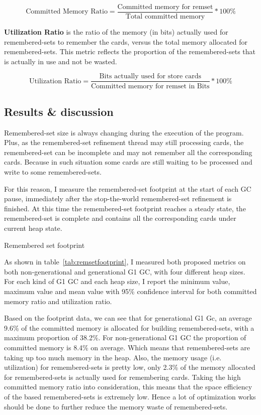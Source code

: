 $$ \text{Committed Memory Ratio} = \frac{\text{Committed memory for remset}}{\text{Total committed memory}} * 100\% $$

\textbf{Utilization Ratio} is the ratio of the memory (in bits) actually used for
remembered-sets to remember the cards, versus the total memory allocated for remembered-sets.
This metric reflects the proportion of the remembered-sets that is actually in use
and not be wasted.

$$ \text{Utilization Ratio} = \frac{\text{Bits actually used for store cards}}{\text{Committed memory for remset in Bits}} * 100\% $$

\subsection{Results \& discussion}

Remembered-set size is always changing during the execution of the program.
Plus, as the remembered-set refinement thread may still processing cards,
the remembered-set can be incomplete and may not remember all the corresponding cards.
Because in such situation some cards are still waiting to
be processed and write to some remembered-sets.

For this reason, I measure the remembered-set footprint at the start of each GC pause, immediately after
the stop-the-world remembered-set refinement is finished. At this time the remembered-set
footprint reaches a steady state, the remembered-set is complete and contains
all the corresponding cards under current heap state.

\begin{table*}
  \centering
  
  \caption{Remembered set footprint}
  \label{tab:remsetfootprint}
\end{table*}

As shown in table~\ref{tab:remsetfootprint}, I measured both proposed metrics
on both non-generational and generational G1 GC, with four different heap sizes.
For each kind of G1 GC and each heap size, I report the minimum value, maximum value and mean value
with 95\% confidence interval for both committed memory ratio and utilization ratio.

Based on the footprint data, we can see that for generational G1 Gc,
an average 9.6\% of the committed memory
is allocated for building remembered-sets, with a maximum proportion of 38.2\%.
For non-generational G1 GC the proportion of committed memory is 8.4\% on average.
Which means that remembered-sets are taking up too much memory in the heap. 
Also, the memory usage (i.e. utilization) for remembered-sets is pretty low,
only 2.3\% of the memory allocated for remembered-sets is actually used for remembering cards.
Taking the high committed memory ratio into consideration, this means that the
space efficiency of the  based remembered-sets is extremely
low. Hence a lot of optimization works should be done to further reduce the memory
waste of remembered-sets.

